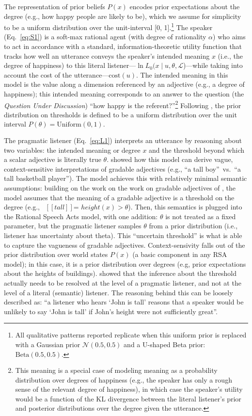 \documentclass[floatsintext,doc]{apa6}
\let\rmarkdownfootnote\footnote%
\def\footnote{\protect\rmarkdownfootnote}
\begin{document}
The representation of prior beliefs $P(x)$ encodes prior expectations about the degree (e.g., how happy people are likely to be), which we assume for simplicity to be a uniform distribution over the unit-interval [0, 1].\footnote{All qualitative patterns reported replicate when this uniform prior is replaced with a Gaussian prior $\mathcal{N}(0.5, 0.5)$ and a U-shaped Beta prior: $\text{Beta}(0.5, 0.5)$.
}
The speaker (Eq.~\ref{eq:S1}) is a soft-max rational agent (with degree of rationality  $\alpha$) who aims to act in accordance with a standard, information-theoretic utility function that tracks how well an utterance conveys the speaker's intended meaning $x$ (i.e., the degree of happiness) to this literal listener---$\ln {L_{0}(x \mid u, \theta, \mathcal{L}}$)---while taking into account the cost of the utterance---$\text{cost}(u)$.
The intended meaning in this model is the value along a dimension referenced by an adjective (e.g., a degree of happiness); this intended meaning corresponds to an answer to the question (the \emph{Question Under Discussion}) ``how happy is the referent?''\footnote{
	This meaning is a special case of modeling meaning as a probability distribution over degrees of happiness (e.g., the speaker has only a rough sense of the relevant degree of happiness), in which case the speaker's utility would be a function of the KL divergence between the literal listener's prior and posterior distributions over the degree given the utterance. 
}
Following , the prior distribution on thresholds is defined to be a uniform distribution over the unit interval $P(\theta) = \text{Uniform}(0, 1)$. 

The pragmatic listener (Eq.~\ref{eq:L1}) interprets an utterance by reasoning about two variables: the intended meaning or degree $x$ and the threshold beyond which a scalar adjective is literally true  $\theta$.  
 showed how this model can derive vague, context-sensitive interpretations of gradable adjectives (e.g., ``a tall boy''~vs.~``a tall basketball player'').
The model achieves this with relatively minimal semantic assumptions: building on the work on the work on gradable adjectives of , the model assumes that the meaning of a gradable adjective is a threshold on the degree (e.g., \mbox{ $[\![ tall ]\!]$}= $height(x) > \theta$). 
Then, this semantics is plugged into the Rational Speech Acts model, with one addition: $\theta$ is not treated as a fixed parameter, but the pragmatic listener samples $\theta$ from a prior distribution (i.e., listener has uncertainty about theta). 
This ``uncertain threshold'' is what is able to capture the vagueness of gradable adjectives. 
Context-sensivity falls out of the prior distribution over world states $P(x)$ (a basic component in any RSA model); in this case, it is a prior distribution over degrees (e.g, prior expectations about the heights of buildings). 
 showed that the inference about the threshold actually needs to be resolved at the level of a pragmatic listener, and not at the level of a literal (semantic) listener. The reasoning behind this can be loosely described as: ``a listener who hears ‘John is tall’ reasons that a speaker would be unlikely to say ‘John is tall’ if John’s height were not sufficiently great''. 
 
\end{document}
